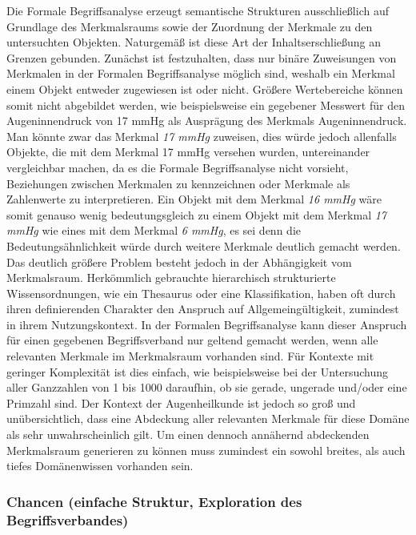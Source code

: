 \documentclass[pagesize,DIV=calc,12pt,draft]{scrreprt}
\begin{document}
Die Formale Begriffsanalyse erzeugt semantische Strukturen ausschließlich auf Grundlage des Merkmalsraums sowie der Zuordnung der Merkmale zu den untersuchten Objekten. 
Naturgemäß ist diese Art der Inhaltserschließung an Grenzen gebunden. 
Zunächst ist festzuhalten, dass nur binäre Zuweisungen von Merkmalen in der Formalen Begriffsanalyse möglich sind, weshalb ein Merkmal einem Objekt entweder zugewiesen ist oder nicht. 
Größere Wertebereiche können somit nicht abgebildet werden, wie beispielsweise ein gegebener Messwert für den Augeninnendruck von 17 mmHg als Ausprägung des Merkmals Augeninnendruck. 
Man könnte zwar das Merkmal \emph{17 mmHg} zuweisen, dies würde jedoch allenfalls Objekte, die mit dem Merkmal 17 mmHg versehen wurden, untereinander vergleichbar machen, da es die Formale Begriffsanalyse nicht vorsieht, Beziehungen zwischen Merkmalen zu kennzeichnen oder Merkmale als Zahlenwerte zu interpretieren. 
Ein Objekt mit dem Merkmal \emph{16 mmHg} wäre somit genauso wenig bedeutungsgleich zu einem Objekt mit dem Merkmal \emph{17 mmHg} wie eines mit dem Merkmal \emph{6 mmHg}, es sei denn die Bedeutungsähnlichkeit würde durch weitere Merkmale deutlich gemacht werden. 
Das deutlich größere Problem besteht jedoch in der Abhängigkeit vom Merkmalsraum. 
Herkömmlich gebrauchte hierarchisch strukturierte Wissensordnungen, wie ein Thesaurus oder eine Klassifikation, haben oft durch ihren definierenden Charakter den Anspruch auf Allgemeingültigkeit, zumindest in ihrem Nutzungskontext. 
In der Formalen Begriffsanalyse kann dieser Anspruch für einen gegebenen Begriffsverband nur geltend gemacht werden, wenn alle relevanten Merkmale im Merkmalsraum vorhanden sind. 
Für Kontexte mit geringer Komplexität ist dies einfach, wie beispielsweise bei der Untersuchung aller Ganzzahlen von 1 bis 1000 daraufhin, ob sie gerade, ungerade und/oder eine Primzahl sind. 
Der Kontext der Augenheilkunde ist jedoch so groß und unübersichtlich, dass eine Abdeckung aller relevanten Merkmale für diese Domäne als sehr unwahrscheinlich gilt. 
Um einen dennoch annähernd abdeckenden Merkmalsraum generieren zu können muss zumindest ein sowohl breites, als auch tiefes Domänenwissen vorhanden sein. 

\subsubsection{Chancen (einfache Struktur, Exploration des Begriffsverbandes)}
\end{document}
